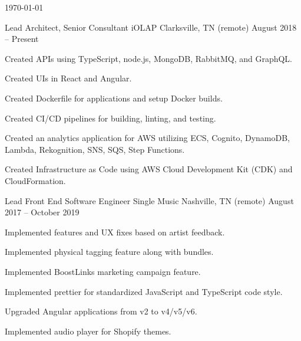 \documentclass[letterpaper]{awesome-cv}
\begin{document}
\makecvfooter
{\today}
{}
{\thepage}

\makecvheader[C]


\begin{cventries}
  \cventry
    {Lead Architect, Senior Consultant}
    {iOLAP}
    {Clarksville, TN (remote)}
    {August 2018 – Present}
    {\begin{cvitems}
      \item {Created APIs using TypeScript, node.js, MongoDB, RabbitMQ, and GraphQL.}
      \item {Created UIs in React and Angular.}
      \item {Created Dockerfile for applications and setup Docker builds.}
      \item {Created CI/CD pipelines for building, linting, and testing.}
      \item {Created an analytics application for AWS utilizing ECS, Cognito, DynamoDB, Lambda, Rekognition, SNS, SQS, Step Functions.}
      \item {Created Infrastructure as Code using AWS Cloud Development Kit (CDK) and CloudFormation.}
      \end{cvitems}}

  \cventry
    {Lead Front End Software Engineer}
    {Single Music}
    {Nashville, TN (remote)}
    {August 2017 – October 2019}
    {\begin{cvitems}
      \item {Implemented features and UX fixes based on artist feedback.}
      \item {Implemented physical tagging feature along with bundles.}
      \item {Implemented BoostLinks marketing campaign feature.}
      \item {Implemented prettier for standardized JavaScript and TypeScript code style.}
      \item {Upgraded Angular applications from v2 to v4/v5/v6.}
      \item {Implemented audio player for Shopify themes.}
      \end{cvitems}}


\end{cventries}
\end{document}
